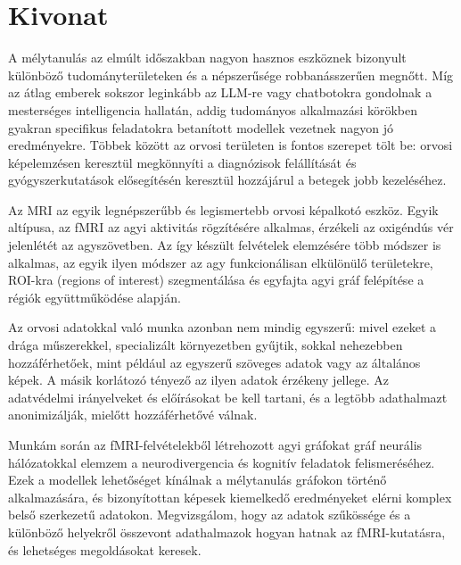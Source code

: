 \setcounter{page}{1}

\selecthungarian

\chapter*{Kivonat}

A mélytanulás az elmúlt időszakban nagyon hasznos eszköznek bizonyult különböző tudományterületeken és a népszerűsége robbanásszerűen megnőtt. Míg az átlag emberek sokszor leginkább az LLM-re vagy chatbotokra gondolnak a mesterséges intelligencia hallatán, addig tudományos alkalmazási körökben gyakran specifikus feladatokra betanított modellek vezetnek nagyon jó eredményekre. Többek között az orvosi területen is fontos szerepet tölt be: orvosi képelemzésen keresztül megkönnyíti a diagnózisok felállítását és gyógyszerkutatások elősegítésén keresztül hozzájárul a betegek jobb kezeléséhez.

Az MRI az egyik legnépszerűbb és legismertebb orvosi képalkotó eszköz. Egyik altípusa, az fMRI az agyi aktivitás rögzítésére alkalmas, érzékeli az oxigéndús vér jelenlétét az agyszövetben. Az így készült felvételek elemzésére több módszer is alkalmas, az egyik ilyen módszer az agy funkcionálisan elkülönülő területekre, ROI-kra (regions of interest) szegmentálása és egyfajta agyi gráf felépítése a régiók együttműködése alapján.

Az orvosi adatokkal való munka azonban nem mindig egyszerű: mivel ezeket a drága műszerekkel, specializált környezetben gyűjtik, sokkal nehezebben hozzáférhetőek, mint például az egyszerű szöveges adatok vagy az általános képek. A másik korlátozó tényező az ilyen adatok érzékeny jellege. Az adatvédelmi irányelveket és előírásokat be kell tartani, és a legtöbb adathalmazt anonimizálják, mielőtt hozzáférhetővé válnak.

Munkám során az fMRI-felvételekből létrehozott agyi gráfokat gráf neurális hálózatokkal elemzem a neurodivergencia és kognitív feladatok felismeréséhez. Ezek a modellek lehetőséget kínálnak a mélytanulás gráfokon történő alkalmazására, és bizonyítottan képesek kiemelkedő eredményeket elérni komplex belső szerkezetű adatokon. Megvizsgálom, hogy az adatok szűkössége és a különböző helyekről összevont adathalmazok hogyan hatnak az fMRI-kutatásra, és lehetséges megoldásokat keresek.

